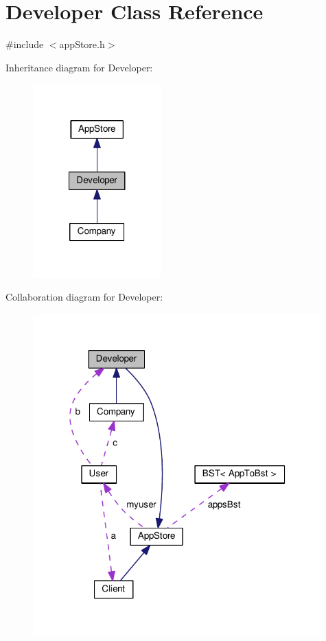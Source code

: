 \hypertarget{class_developer}{\section{Developer Class Reference}
\label{class_developer}
}


{\ttfamily \#include $<$app\-Store.\-h$>$}



Inheritance diagram for Developer\-:
\nopagebreak
\begin{figure}[H]
\begin{center}
\leavevmode
\includegraphics[width=140pt]{class_developer__inherit__graph}
\end{center}
\end{figure}


Collaboration diagram for Developer\-:
\nopagebreak
\begin{figure}[H]
\begin{center}
\leavevmode
\includegraphics[width=314pt]{class_developer__coll__graph}
\end{center}
\end{figure}
